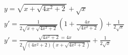 \begin{ex}
\begin{align}
&y=\sqrt{x+\sqrt{4x^2+2}}+\sqrt{x}\nonumber\\
&y'=\frac{1}{2\sqrt{x+\sqrt{4x^2+2}}}\left(1+\frac{4x}{\sqrt{4x^2+2}}\right)+\frac{1}{2\sqrt{x}}\nonumber\\
&y'=\frac{\sqrt{4x^2+2}=4x}{2\sqrt{(4x^2+2)(x+\sqrt{4x^2+2})}}+\frac{1}{2\sqrt{x}}\nonumber
\end{align}
\end{ex}

